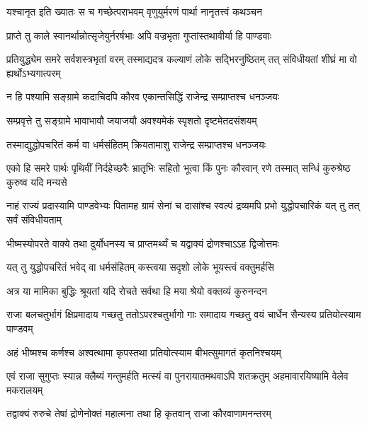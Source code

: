 \twolineshloka
{यश्चानृत इति ख्यातः स च गच्छेत्पराभवम्}
{वृणुयुर्मरणं पार्था नानृतत्त्वं कथञ्चन}


\twolineshloka
{प्राप्ते तु काले स्वानर्थान्नोत्सृजेयुर्नरर्षभाः}
{अपि वज्रभृता गुप्तांस्तथावीर्या हि पाण्डवाः}


\onelineshloka
{प्रतियुद्ध्येम समरे सर्वशस्त्रभृतां वरम्}
\twolineshloka
{तस्माद्यदत्र कल्याणं लोके सद्भिरनुष्ठितम्}
{तत् संविधीयतां शीघ्रं मा वो ह्यर्थोऽभ्यगात्परम्}


\twolineshloka
{न हि पश्यामि सङ्ग्रामे कदाचिदपि कौरव}
{एकान्तसिद्धिं राजेन्द्र सम्प्राप्तश्च धनञ्जयः}


\twolineshloka
{सम्प्रवृत्ते तु सङ्ग्रामे भावाभावौ जयाजयौ}
{अवश्यमेकं स्पृशतो दृष्टमेतदसंशयम्}


\twolineshloka
{तस्माद्युद्धोपचरितं कर्म वा धर्मसंहितम्}
{क्रियतामाशु राजेन्द्र सम्प्राप्तश्च धनञ्जयः}


\threelineshloka
{एको हि समरे पार्थः पृथिवीं निर्दहेच्छरैः}
{भ्रातृभिः सहितो भूत्वा किं पुनः कौरवान् रणे}
{तस्मात् सन्धिं कुरुश्रेष्ठ कुरुष्व यदि मन्यसे}




\threelineshloka
{नाहं राज्यं प्रदास्यामि पाण्डवेभ्यः पितामह}
{ग्रामं सेनां च दासांश्च स्वल्पं द्रव्यमपि प्रभो}
{युद्धोपचारिकं यत् तु तत् सर्वं संविधीयताम्}



\twolineshloka
{भीष्मस्योपरते वाक्ये तथा दुर्योधनस्य च}
{प्राप्तमर्थ्यं च यद्वाक्यं द्रोणश्चाऽऽह द्विजोत्तमः}


\twolineshloka
{यत् तु युद्धोपचरितं भवेद् वा धर्मसंहितम्}
{कस्त्वया सदृशो लोके भूयस्त्वं वक्तुमर्हसि}


\twolineshloka
{अत्र या मामिका बुद्धिः श्रूयतां यदि रोचते}
{सर्वथा हि मया श्रेयो वक्तव्यं कुरुनन्दन}


\threelineshloka
{राजा बलचतुर्भागं क्षिप्रमादाय गच्छतु}
{ततोऽपरश्चतुर्भागो गाः समादाय गच्छतु}
{वयं चार्धेन सैन्यस्य प्रतियोत्स्याम पाण्डवम्}


\twolineshloka
{अहं भीष्मश्च कर्णश्च अश्वत्थामा कृपस्तथा}
{प्रतियोत्स्याम बीभत्सुमागतं कृतनिश्चयम्}


\threelineshloka
{एवं राजा सुगुप्तः स्यान्न क्लैब्यं गन्तुमर्हति}
{मत्स्यं वा पुनरायातमथवाऽपि शतक्रतुम्}
{अहमावारयिष्यामि वेलेव मकरालयम्}



\twolineshloka
{तद्वाक्यं रुरुचे तेषां द्रोणेनोक्तं महात्मना}
{तथा हि कृतवान् राजा कौरवाणामनन्तरम्}


